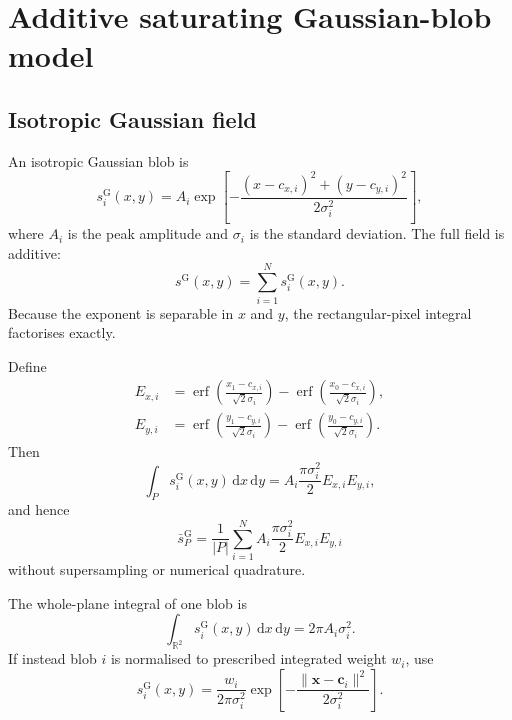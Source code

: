 \documentclass[11pt,a4paper]{article}
\newcommand{\R}{\mathbb{R}}
\newcommand{\erf}{\operatorname{erf}}
\begin{document}
\section{Additive saturating Gaussian-blob model}

\subsection{Isotropic Gaussian field}

An isotropic Gaussian blob is
\begin{equation}
s_i^{\mathrm{G}}(x,y)
=
A_i\exp\!\left[
-\frac{(x-c_{x,i})^2+(y-c_{y,i})^2}{2\sigma_i^2}
\right],
\label{eq:gaussian-field}
\end{equation}
where $A_i$ is the peak amplitude and $\sigma_i$ is the standard deviation.
The full field is additive:
\begin{equation}
s^{\mathrm{G}}(x,y)=\sum_{i=1}^{N}s_i^{\mathrm{G}}(x,y).
\end{equation}
Because the exponent is separable in $x$ and $y$, the rectangular-pixel integral
factorises exactly.

Define
\begin{align}
E_{x,i}
&=
\erf\!\left(\frac{x_1-c_{x,i}}{\sqrt{2}\sigma_i}\right)
-
\erf\!\left(\frac{x_0-c_{x,i}}{\sqrt{2}\sigma_i}\right),\\
E_{y,i}
&=
\erf\!\left(\frac{y_1-c_{y,i}}{\sqrt{2}\sigma_i}\right)
-
\erf\!\left(\frac{y_0-c_{y,i}}{\sqrt{2}\sigma_i}\right).
\end{align}
Then
\begin{equation}
\int_P s_i^{\mathrm{G}}(x,y)\,\mathrm{d}x\,\mathrm{d}y
=
A_i\frac{\pi\sigma_i^2}{2}E_{x,i}E_{y,i},
\label{eq:gaussian-pixel-integral}
\end{equation}
and hence
\begin{equation}
\boxed{
\bar{s}^{\mathrm{G}}_P
=
\frac{1}{|P|}
\sum_{i=1}^{N}
A_i\frac{\pi\sigma_i^2}{2}E_{x,i}E_{y,i}
}
\label{eq:gaussian-pixel-average}
\end{equation}
without supersampling or numerical quadrature.

The whole-plane integral of one blob is
\begin{equation}
\int_{\R^2}s_i^{\mathrm{G}}(x,y)\,\mathrm{d}x\,\mathrm{d}y
=2\pi A_i\sigma_i^2.
\end{equation}
If instead blob $i$ is normalised to prescribed integrated weight $w_i$, use
\begin{equation}
s_i^{\mathrm{G}}(x,y)
=
\frac{w_i}{2\pi\sigma_i^2}
\exp\!\left[-\frac{\|\bm{x}-\bm{c}_i\|^2}{2\sigma_i^2}\right].
\end{equation}
\end{document}

